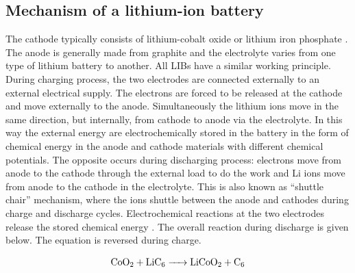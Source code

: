 \subsection*{Mechanism of a lithium-ion battery}
The cathode typically consists of lithium-cobalt oxide  or lithium iron phosphate . The anode is generally made from graphite and the electrolyte varies from one type of lithium battery to another. All LIBs have a similar working principle. During charging process, the two electrodes are connected externally to an external electrical supply. The electrons are forced to be released at the cathode and move externally to the anode. Simultaneously the lithium ions move in the same direction, but internally, from cathode to anode via the electrolyte. In this way the external energy are electrochemically stored in the battery in the form of chemical energy in the anode and cathode materials with different chemical potentials. The opposite occurs during discharging process: electrons move from anode to the cathode through the external load to do the work and Li ions move from anode to the cathode in the electrolyte. This is also known as \enquote{shuttle chair} mechanism, where the  ions shuttle between the anode and cathodes during charge and discharge cycles. Electrochemical reactions at the two electrodes release the stored chemical energy \cite{deng_li-ion_2015}. The overall reaction during discharge is given below. The equation is reversed during charge. 

\begin{equation}
    \ce{CoO2 + LiC6 -> LiCoO2 + C6}
\end{equation}

\vspace{3mm}

